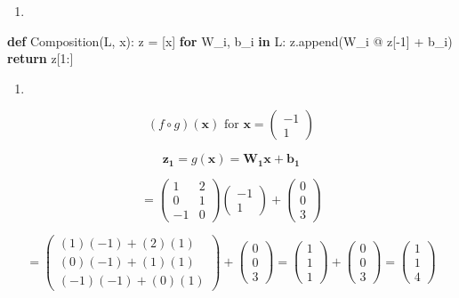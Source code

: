 \documentclass[
  letterpaper,
  DIV=11,
  numbers=noendperiod]{scrartcl}
\newenvironment{Shaded}{\begin{snugshade}}{\end{snugshade}}
\newcommand{\ControlFlowTok}[1]{\textcolor[rgb]{0.00,0.23,0.31}{\textbf{#1}}}
\newcommand{\DecValTok}[1]{\textcolor[rgb]{0.68,0.00,0.00}{#1}}
\newcommand{\KeywordTok}[1]{\textcolor[rgb]{0.00,0.23,0.31}{\textbf{#1}}}
\newcommand{\NormalTok}[1]{\textcolor[rgb]{0.00,0.23,0.31}{#1}}
\newcommand{\OperatorTok}[1]{\textcolor[rgb]{0.37,0.37,0.37}{#1}}
\providecommand{\tightlist}{%
  \setlength{\itemsep}{0pt}\setlength{\parskip}{0pt}}\usepackage{longtable,booktabs,array}
\begin{document}
\begin{enumerate}
\def\labelenumi{\arabic{enumi}.}
\setcounter{enumi}{2}
\tightlist
\item
\end{enumerate}

\begin{Shaded}
\begin{Highlighting}[]
\KeywordTok{def}\NormalTok{ Composition(L, x):}
\NormalTok{    z }\OperatorTok{=}\NormalTok{ [x]}
    \ControlFlowTok{for}\NormalTok{ W\_i, b\_i }\KeywordTok{in}\NormalTok{ L:}
\NormalTok{        z.append(W\_i }\OperatorTok{@}\NormalTok{ z[}\OperatorTok{{-}}\DecValTok{1}\NormalTok{] }\OperatorTok{+}\NormalTok{ b\_i)}
    \ControlFlowTok{return}\NormalTok{ z[}\DecValTok{1}\NormalTok{:]  }
\end{Highlighting}
\end{Shaded}

\begin{enumerate}
\def\labelenumi{\arabic{enumi}.}
\setcounter{enumi}{3}
\tightlist
\item
\end{enumerate}

\[(f \circ g)(\mathbf{x}) \text{ for } \mathbf{x} = \begin{pmatrix}-1\\1\end{pmatrix}\]

\[\mathbf{z_1} = g(\mathbf{x}) = \mathbf{W_1}\mathbf{x} + \mathbf{b_1}\]

\[= \begin{pmatrix}1 & 2\\0 & 1\\-1 & 0\end{pmatrix}\begin{pmatrix}-1\\1\end{pmatrix} + \begin{pmatrix}0\\0\\3\end{pmatrix}\]

\[= \begin{pmatrix}(1)(-1) + (2)(1)\\(0)(-1) + (1)(1)\\(-1)(-1) + (0)(1)\end{pmatrix} + \begin{pmatrix}0\\0\\3\end{pmatrix} = \begin{pmatrix}1\\1\\1\end{pmatrix} + \begin{pmatrix}0\\0\\3\end{pmatrix} = \begin{pmatrix}1\\1\\4\end{pmatrix}\]
\end{document}
